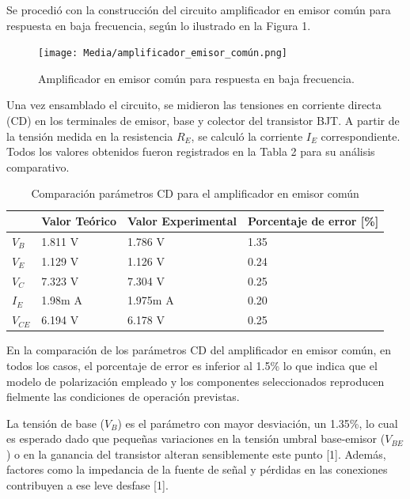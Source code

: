\documentclass[journal]{IEEEtran}
\begin{document}
\par Se procedió con la construcción del circuito amplificador en emisor común para respuesta en baja frecuencia, según lo ilustrado en la Figura 1. 
\begin{figure}[H]
    \centering
    \texttt{[image: Media/amplificador\_emisor\_común.png]}
    \caption{Amplificador en emisor común para respuesta en baja frecuencia.}
    \label{fig:amplificador_emisor_común.}
\end{figure}
\par Una vez ensamblado el circuito, se midieron las tensiones en corriente directa (CD) en los terminales de emisor, base y colector del transistor BJT. A partir de la tensión medida en la resistencia \( R_E \), se calculó la corriente \( I_E \) correspondiente. Todos los valores obtenidos fueron registrados en la Tabla 2 para su análisis comparativo.
\begin{table}[h]
    \caption{Comparación parámetros CD para el amplificador en emisor común}
    \centering
    \renewcommand{\arraystretch}{1.2} %
    \begin{tabular}{|l|p{2cm}|p{2cm}|p{2cm}|}
        \hline
        & \textbf{Valor Teórico} & \textbf{Valor Experimental} & \textbf{Porcentaje de error [\%]} \\
        \hline
        \( V_B \) & 1.811 V  & 1.786 V  & 1.35 \\
        \hline
        \( V_E \) & 1.129 V   & 1.126 V  & 0.24 \\
        \hline
        \( V_C \) & 7.323 V & 7.304 V & 0.25 \\
        \hline
        \( I_E \) & 1.98m A & 1.975m A & 0.20 \\
        \hline
        \( V_{CE} \) & 6.194 V & 6.178 V & 0.25 \\
        \hline
    \end{tabular}
    \label{tab:parámetrosCD}
\end{table}
\par En la comparación de los parámetros CD del amplificador en emisor común, en todos los casos, el porcentaje de error es inferior al 1.5\% lo que indica que el modelo de polarización empleado y los componentes seleccionados reproducen fielmente las condiciones de operación previstas.
\par La tensión de base (\( V_B \)) es el parámetro con mayor desviación, un 1.35\%, lo cual es esperado dado que pequeñas variaciones en la tensión umbral base-emisor (\( V_{BE} \)) o en la ganancia del transistor alteran sensiblemente este punto [1]. Además, factores como la impedancia de la fuente de señal y pérdidas en las conexiones contribuyen a ese leve desfase [1].
\end{document}
